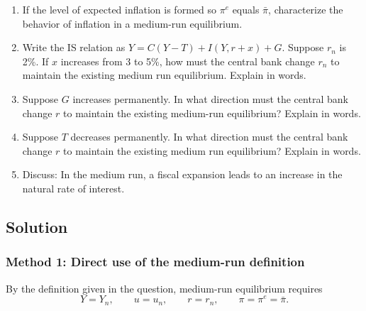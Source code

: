 \documentclass[12pt]{article}
\begin{document}
\begin{enumerate}[label=(\alph*)]
    \item If the level of expected inflation is formed so \(\pi^e\) equals \(\bar{\pi}\), characterize the behavior of inflation in a medium-run equilibrium.
    \item Write the IS relation as \(Y=C(Y-T)+I(Y,r+x)+G\). Suppose \(r_n\) is 2\%. If \(x\) increases from 3 to 5\%, how must the central bank change \(r_n\) to maintain the existing medium run equilibrium. Explain in words.
    \item Suppose \(G\) increases permanently. In what direction must the central bank change \(r\) to maintain the existing medium-run equilibrium? Explain in words.
    \item Suppose \(T\) decreases permanently. In what direction must the central bank change \(r\) to maintain the existing medium run equilibrium? Explain in words.
    \item Discuss: In the medium run, a fiscal expansion leads to an increase in the natural rate of interest.
\end{enumerate}

\subsection{Solution}

\subsubsection{Method 1: Direct use of the medium-run definition}
By the definition given in the question, medium-run equilibrium requires
\[
Y=Y_n,
\qquad
u=u_n,
\qquad
r=r_n,
\qquad
\pi=\pi^e=\bar{\pi}.
\]
\end{document}
